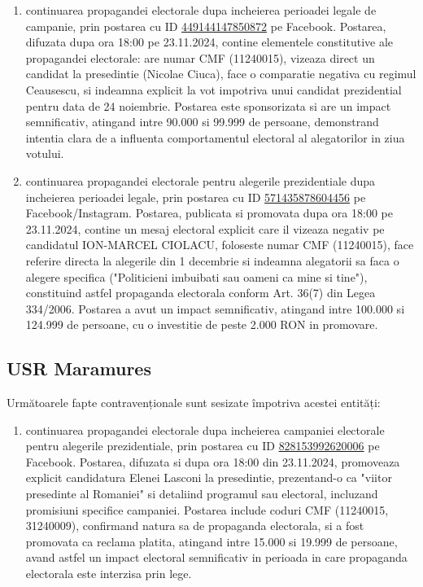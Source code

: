 \documentclass[a4paper,12pt]{article}
\begin{document}
\begin{enumerate}[leftmargin=*, label=\arabic*.)]
    \item continuarea propagandei electorale dupa incheierea perioadei legale de campanie, prin postarea cu ID \href{https://www.facebook.com/ads/library/?id=449144147850872}{449144147850872} pe Facebook. Postarea, difuzata dupa ora 18:00 pe 23.11.2024, contine elementele constitutive ale propagandei electorale: are numar CMF (11240015), vizeaza direct un candidat la presedintie (Nicolae Ciuca), face o comparatie negativa cu regimul Ceausescu, si indeamna explicit la vot impotriva unui candidat prezidential pentru data de 24 noiembrie. Postarea este sponsorizata si are un impact semnificativ, atingand intre 90.000 si 99.999 de persoane, demonstrand intentia clara de a influenta comportamentul electoral al alegatorilor in ziua votului.
    \item continuarea propagandei electorale pentru alegerile prezidentiale dupa incheierea perioadei legale, prin postarea cu ID \href{https://www.facebook.com/ads/library/?id=571435878604456}{571435878604456} pe Facebook/Instagram. Postarea, publicata si promovata dupa ora 18:00 pe 23.11.2024, contine un mesaj electoral explicit care il vizeaza negativ pe candidatul ION-MARCEL CIOLACU, foloseste numar CMF (11240015), face referire directa la alegerile din 1 decembrie si indeamna alegatorii sa faca o alegere specifica ("Politicieni imbuibati sau oameni ca mine si tine"), constituind astfel propaganda electorala conform Art. 36(7) din Legea 334/2006. Postarea a avut un impact semnificativ, atingand intre 100.000 si 124.999 de persoane, cu o investitie de peste 2.000 RON in promovare.
\end{enumerate}

\vspace{0.5cm}

\subsection{USR Maramures}
Următoarele fapte contravenționale sunt sesizate împotriva acestei entități:

\begin{enumerate}[leftmargin=*, label=\arabic*.)]
    \item continuarea propagandei electorale dupa incheierea campaniei electorale pentru alegerile prezidentiale, prin postarea cu ID \href{https://www.facebook.com/ads/library/?id=828153992620006}{828153992620006} pe Facebook. Postarea, difuzata si dupa ora 18:00 din 23.11.2024, promoveaza explicit candidatura Elenei Lasconi la presedintie, prezentand-o ca "viitor presedinte al Romaniei" si detaliind programul sau electoral, incluzand promisiuni specifice campaniei. Postarea include coduri CMF (11240015, 31240009), confirmand natura sa de propaganda electorala, si a fost promovata ca reclama platita, atingand intre 15.000 si 19.999 de persoane, avand astfel un impact electoral semnificativ in perioada in care propaganda electorala este interzisa prin lege.
\end{enumerate}
\end{document}
